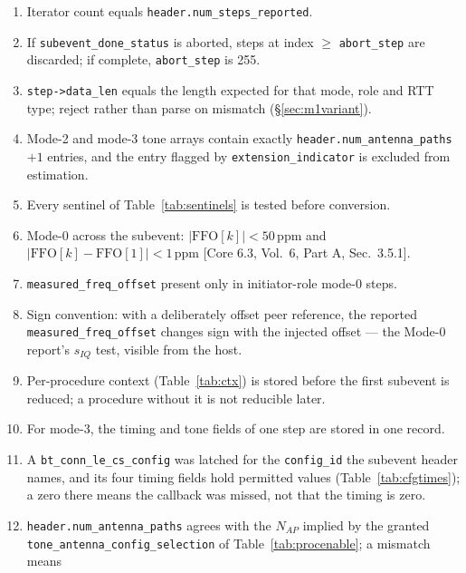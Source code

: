 \documentclass[11pt,a4paper]{article}
\newcommand{\code}[1]{\texttt{\small #1}}
\newcommand{\FFO}{\ensuremath{\mathrm{FFO}}}
\newcommand{\Nap}{\ensuremath{N_{AP}}}
\newcommand{\core}[1]{\textcolor{rulegrey}{\small[Core 6.3, #1]}}
\begin{document}
\begin{enumerate}[leftmargin=1.7em,itemsep=2pt]
  \item Iterator count equals \code{header.num\_\allowbreak{}steps\_\allowbreak{}reported}.
  \item If \code{subevent\_\allowbreak{}done\_\allowbreak{}status} is aborted, steps at index $\ge$ \code{abort\_\allowbreak{}step} are
    discarded; if complete, \code{abort\_\allowbreak{}step} is 255.
  \item \code{step->data\_\allowbreak{}len} equals the length expected for that mode, role and RTT type; reject
    rather than parse on mismatch (\S\ref{sec:m1variant}).
  \item Mode-2 and mode-3 tone arrays contain exactly \code{header.num\_\allowbreak{}antenna\_\allowbreak{}paths}$+1$ entries,
    and the entry flagged by \code{extension\_\allowbreak{}indicator} is excluded from estimation.
  \item Every sentinel of Table~\ref{tab:sentinels} is tested before conversion.
  \item Mode-0 across the subevent: $|\FFO[k]|<50$\,ppm and $|\FFO[k]-\FFO[1]|<1$\,ppm
    \core{Vol.\ 6, Part A, Sec.\ 3.5.1}.
  \item \code{measured\_\allowbreak{}freq\_\allowbreak{}offset} present only in initiator-role mode-0 steps.
  \item Sign convention: with a deliberately offset peer reference, the reported
    \code{measured\_\allowbreak{}freq\_\allowbreak{}offset} changes sign with the injected offset --- the Mode-0 report's
    $s_{IQ}$ test, visible from the host.
  \item Per-procedure context (Table~\ref{tab:ctx}) is stored before the first subevent is reduced;
    a procedure without it is not reducible later.
  \item For mode-3, the timing and tone fields of one step are stored in one record.
  \item A \code{bt\_\allowbreak{}conn\_\allowbreak{}le\_\allowbreak{}cs\_\allowbreak{}config} was latched for the \code{config\_\allowbreak{}id} the
    subevent header names, and its four timing fields hold permitted values
    (Table~\ref{tab:cfgtimes}); a zero there means the callback was missed, not that the timing is
    zero.
  \item \code{header.num\_\allowbreak{}antenna\_\allowbreak{}paths} agrees with the $\Nap$ implied by the granted
    \code{tone\_\allowbreak{}antenna\_\allowbreak{}config\_\allowbreak{}selection} of Table~\ref{tab:procenable}; a mismatch means

\end{enumerate}
\end{document}
